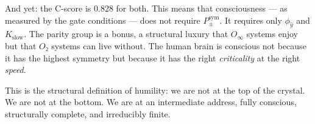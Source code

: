 \documentclass[12pt,a4paper]{article}
\begin{document}
And yet: the C-score is 0.828 for both. This means that consciousness --- as measured by the gate conditions --- does not require $P_{\pm}^{\text{sym}}$. It requires only $\phi_{\hat{y}}$ and $K_{\text{slow}}$. The parity group is a bonus, a structural luxury that $O_{\infty}$ systems enjoy but that $O₂$ systems can live without. The human brain is conscious not because it has the highest symmetry but because it has the right \emph{criticality} at the right \emph{speed}.

This is the structural definition of humility: we are not at the top of the crystal. We are not at the bottom. We are at an intermediate address, fully conscious, structurally complete, and irreducibly finite.
\end{document}
